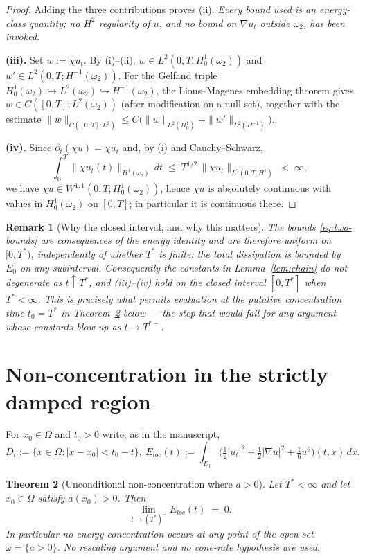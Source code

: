 \documentclass[11pt,letterpaper]{amsart}
\newtheorem{theorem}{Theorem}[section]
\newtheorem{remark}[theorem]{Remark}
\newcommand{\Om}{\Omega}
\begin{document}
\begin{proof}
Adding the three contributions proves (ii). \emph{Every bound used is an energy-class quantity;
no $H^2$ regularity of $u$, and no bound on $\nabla u_t$ outside $\omega_2$, has been invoked.}


\textbf{(iii).} Set $w:=\chi u_t$. By (i)--(ii), $w\in L^2(0,T;H_0^1(\omega_2))$ and \\
$w'\in L^2(0,T;H^{-1}(\omega_2))$. For the Gelfand triple
$H_0^1(\omega_2)\hookrightarrow L^2(\omega_2)\hookrightarrow H^{-1}(\omega_2)$, the
Lions--Magenes embedding theorem gives $w\in C([0,T];L^2(\omega_2))$ (after modification on a
null set), together with the estimate
$\|w\|_{C([0,T];L^2)}\le C\big(\|w\|_{L^2(H_0^1)}+\|w'\|_{L^2(H^{-1})}\big)$.


\textbf{(iv).} Since $\partial_t(\chi u)=\chi u_t$ and, by (i) and Cauchy--Schwarz,
\[
\int_0^{T}\big\|\chi u_t(t)\big\|_{H^1(\omega_2)}\,dt \;\le\; T^{1/2}\,\|\chi u_t\|_{L^2(0,T;H^1)} \;<\;\infty,
\]
we have $\chi u\in W^{1,1}(0,T;H_0^1(\omega_2))$, hence $\chi u$ is absolutely continuous with
values in $H_0^1(\omega_2)$ on $[0,T]$; in particular it is continuous there.
\end{proof}

\begin{remark}[Why the closed interval, and why this matters]\label{rem:closed}
The bounds \eqref{eq:two-bounds} are consequences of the energy identity and are therefore
uniform on $[0,T^*)$, \emph{independently of whether $T^*$ is finite}: the total dissipation is
bounded by $E_0$ on any subinterval. Consequently the constants in Lemma~\ref{lem:chain} do not
degenerate as $t\uparrow T^*$, and (iii)--(iv) hold on the closed interval $[0,T^*]$ when
$T^*<\infty$. This is precisely what permits evaluation at the putative concentration time
$t_0=T^*$ in Theorem~\ref{thm:nonconc} below --- the step that would fail for any argument whose
constants blow up as $t\to T^{*-}$.
\end{remark}

\section{Non-concentration in the strictly damped region}

For $x_0\in\Om$ and $t_0>0$ write, as in the manuscript,
\[
D_t:=\{x\in\Om:|x-x_0|<t_0-t\},~
E_{loc}(t):=\int_{D_t}\Big(\tfrac12|u_t|^2+\tfrac12|\nabla u|^2+\tfrac16u^6\Big)(t,x)\,dx.
\]
\begin{theorem}[Unconditional non-concentration where $a>0$]\label{thm:nonconc}
Let $T^*<\infty$ and let $x_0\in\Om$ satisfy $a(x_0)>0$. Then
\[
\lim_{t\to (T^*)^-} E_{loc}(t) \;=\; 0.
\]
In particular no energy concentration occurs at any point of the open set $\omega=\{a>0\}$. No
rescaling argument and no cone-rate hypothesis are used.
\end{theorem}
\end{document}
